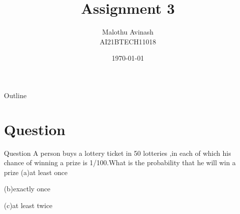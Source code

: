 \documentclass{beamer}
\title{Assignment 3}%
\author{Malothu Avinash \\ AI21BTECH11018}
\date{\today}
\begin{document}
\begin{frame}
    \titlepage 
\end{frame}



\begin{frame}{Outline}
    \tableofcontents
\end{frame}


\section{Question}
\begin{frame}{Question}
A person buys a lottery ticket in 50 lotteries ,in each of which his chance of winning a prize is 1/100.What is the probability that he will win a prize
(a)at least once
    
(b)exactly once
    
(c)at least twice
\end{frame}
\end{document}

